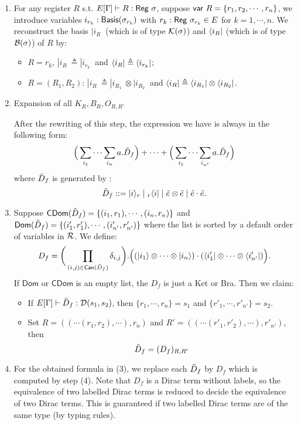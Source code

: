 \begin{enumerate}
  \item For any register $R$ s.t. $E[\Gamma]\vdash R : \mathsf{Reg}\  \sigma$, suppose $\mathsf{var}\  R = \{r_1,r_2,\cdots,r_n\}$, 
  we introduce variables $i_{r_k} : \mathsf{Basis}(\sigma_{r_k})$ with $r_k : \mathsf{Reg}\  \sigma_{r_k} \in E$ for $k = 1,\cdots, n$. We reconstruct the basis $|i_R\>$ (which is of type $\mathcal{K}(\sigma)$) and $\langle i_R|$ (which is of type $\mathcal{B}(\sigma)$) of $R$ by:
  \begin{itemize}
    \item $R = r_k$, $|i_R\> \triangleq |i_{r_k}\>$ and $\langle i_R| \triangleq \langle i_{r_k}|$;
    \item $R = (R_1,R_2)$: $|i_R\> \triangleq |i_{R_1}\> \otimes |i_{R_2}\>$ and $\langle i_R| \triangleq \langle i_{R_1}| \otimes \langle i_{R_2}|$.
  \end{itemize}
    \item Expansion of all $K_R,B_R,O_{R,R'}$

    
    After the rewriting of this step, the expression we have is always in the following form:
    $$
    \Big(\sum_{i_1}\cdots\sum_{i_n} a.\tilde{D}_f\Big) + \cdots + \Big(\sum_{i_1}\cdots\sum_{i_{n'}} a.\tilde{D}_f\Big)
    $$
    where $\tilde{D}_f$ is generated by :
    $$\tilde{D}_f ::= |i\rangle_r \mid {}_r\langle i| \mid \tilde{e}\otimes\tilde{e} \mid \tilde{e}\cdot\tilde{e}. $$
    \item
    Suppose $\mathsf{CDom}(\tilde{D}_{f}) = \{(i_1,r_1),\cdots,(i_n,r_n)\}$ and $\mathsf{Dom}(\tilde{D}_{f}) = \{(i'_1,r'_1),\cdots,(i'_{n'},r'_{n'})\}$ where the list is sorted by a default order of variables in $\mathcal{R}$. We define:
    $$D_f = \bigg(\prod_{(i,j)\in \mathsf{Can}(\tilde{D}_f)}\delta_{i,j}\bigg).\Big((|i_1\rangle\otimes\cdots\otimes|i_n\rangle) \cdot (\langle i'_1|\otimes\cdots\otimes\langle i'_{n'}|)\Big).$$
    If $\mathsf{Dom}$ or $\mathsf{CDom}$ is an empty list, the $D_f$ is just a Ket or Bra.
    Then we claim:
    \begin{itemize}
        \item If $E[\Gamma]\vdash \tilde{D}_f : \mathcal{D}(s_1,s_2)$, then $\{r_1,\cdots,r_n\} = s_1$ and
        $\{r'_1,\cdots,r'_{n'}\} = s_2$.
        \item Set $R = ((\cdots(r_1,r_2),\cdots),r_n)$ and $R' = ((\cdots(r'_1,r'_2),\cdots),r'_{n'})$, then
        $$\tilde{D}_{f} = (D_f)_{R,R'}$$
    \end{itemize}
    \item For the obtained formula in (3), we replace each $\tilde{D}_f$ by $D_f$ which is computed by step (4). Note that $D_f$ is a Dirac term without labels, so the equivalence of two labelled Dirac terms is reduced to decide the equivalence of two Dirac terms. This is guaranteed if two labelled Dirac terms are of the same type (by typing rules).
\end{enumerate}
